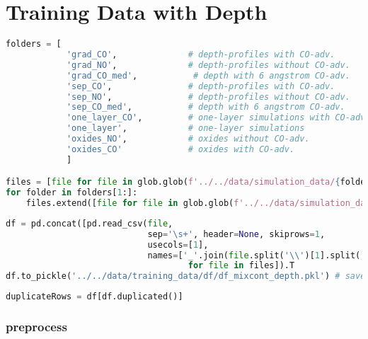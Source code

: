 \hypertarget{training-data-with-depth}{%
\section{Training Data with Depth}\label{training-data-with-depth}}

\begin{lstlisting}[language=Python]
folders = [
            'grad_CO',              # depth-profiles with CO-adv.       with gradient layers
            'grad_NO',              # depth-profiles without CO-adv.    with gradient layers
            'grad_CO_med',           # depth with 6 angstrom CO-adv.       with gradient layers
            'sep_CO',               # depth-profiles with CO-adv.       with separated layers
            'sep_NO',               # depth-profiles without CO-adv.    with separated layers
            'sep_CO_med',           # depth with 6 angstrom CO-adv.       with separated layers
            'one_layer_CO',         # one-layer simulations with CO-adv.
            'one_layer',            # one-layer simulations
            'oxides_NO',            # oxides without CO-adv.
            'oxides_CO'             # oxides with CO-adv.
            ]

files = [file for file in glob.glob(f'../../data/simulation_data/{folders[0]}/*.spc')]
for folder in folders[1:]:
    files.extend([file for file in glob.glob(f'../../data/simulation_data/{folder}/*.spc')])
\end{lstlisting}

\begin{lstlisting}[language=Python]
df = pd.concat([pd.read_csv(file,
                            sep='\s+', header=None, skiprows=1,
                            usecols=[1],
                            names=['_'.join(file.split('\\')[1].split('_')[:-1])]).T 
                                    for file in files]).T
df.to_pickle('../../data/training_data/df/df_mixcont_depth.pkl') # save the df without preprocessing
\end{lstlisting}

\begin{lstlisting}[language=Python]
duplicateRows = df[df.duplicated()]
\end{lstlisting}

\hypertarget{preprocess}{%
\subsubsection{preprocess}\label{preprocess}}

